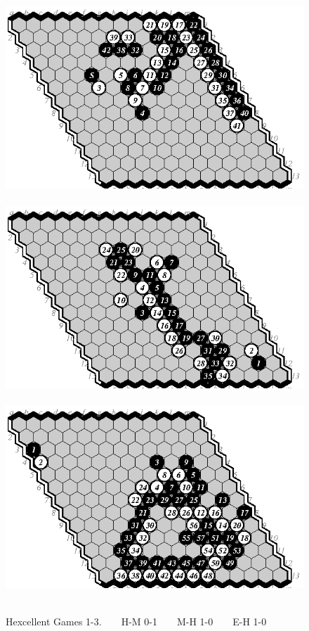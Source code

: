 \documentclass{icga}
\def\Hent{\mbox{\sc Hexcellent}}
\begin{document}
\begin{figure}[hbp]
\hspace*{-2cm}\
\includegraphics[scale=1]{pix/13.hm1.eps}\hspace*{-2cm}\
\includegraphics[scale=1]{pix/13.mh2.eps}\hspace*{-2cm}\
\includegraphics[scale=1]{pix/13.eh1.eps}\hspace*{-2cm}\
\caption{\Hent{} Games 1-3. ~ ~ H-M 0-1 ~ ~ M-H 1-0 ~ ~ E-H 1-0}
\end{figure}
\end{document}
